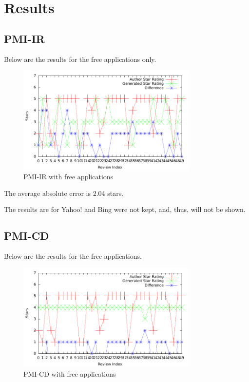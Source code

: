 \documentclass[11pt]{report} %
\begin{document}
\chapter{Results}
\label{chapter:results}
	\section{PMI-IR}

Below are the results for the free applications only.

	\begin{figure}[H]
	\centering
	\includegraphics[width=0.8\textwidth]{data/pmi-free.pdf}
	\caption{PMI-IR with free applications}
	\label{fig:pmi-free}
	\end{figure}

The average absolute error is 2.04 stars.

The results are for Yahoo! and Bing were not kept, and, thus, will not be shown.

	\section{PMI-CD}

Below are the results for the free applications.
	
	\begin{figure}[H]
	\centering
	\includegraphics[width=0.8\textwidth]{data/pmi-cd-free.pdf}
	\caption{PMI-CD with free applications}
	\label{fig:pmi-cd-free}
	\end{figure}
\end{document}
